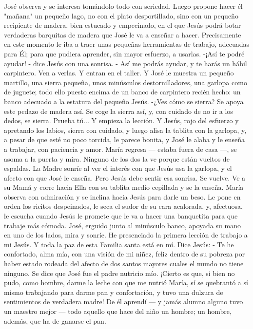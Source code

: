 \documentclass[12pt]{book} %
\begin{document}
José observa y se interesa tomándolo todo con seriedad. Luego propone hacer él "mañana" un pequeño lago, no con el plato desportillado, sino con un pequeño recipiente de madera, bien estucado y empecinado, en el que Jesús podrá botar verdaderas barquitas de madera que José le va a enseñar a hacer. Precisamente en este momento le iba a traer unas pequeñas herramientas de trabajo, adecuadas para Él; para que pudiera aprender, sin mayor esfuerzo, a usarlas. 
-¡Así te podré ayudar! - dice Jesús con una sonrisa. 
- Así me podrás ayudar, y te harás un hábil carpintero. Ven a verlas. 
Y entran en el taller. Y José le muestra un pequeño martillo, una sierra pequeña, unos minúsculos destornilladores, una 
garlopa como de juguete; todo ello puesto encima de un banco de carpintero recién hecho: un banco adecuado a la estatura del pequeño Jesús. 
-¿Ves cómo se sierra? Se apoya este pedazo de madera así. Se coge la sierra así, y, con cuidado de no ir a los dedos, se 
sierra. Prueba tú... 
Y empieza la lección. Y Jesús, rojo del esfuerzo y apretando los labios, sierra con cuidado, y luego alisa la tablita con la 
garlopa, y, a pesar de que esté no poco torcida, le parece bonita, y José le alaba y le enseña a trabajar, con paciencia y amor.           
María regresa — estaba fuera de casa —, se asoma a la puerta y mira. Ninguno de los dos la ve porque están vueltos de 
espaldas. La Madre sonríe al ver el interés con que Jesús usa la garlopa, y el afecto con que José le enseña. 
Pero Jesús debe sentir esa sonrisa. Se vuelve. Ve a su Mamá y corre hacia Ella con su tablita medio cepillada y se la 
enseña. María observa con admiración y se inclina hacia Jesús para darle un beso. Le pone en orden los ricitos despeinados, le seca el sudor de su cara acalorada, y, afectuosa, le escucha cuando Jesús le promete que le va a hacer una banquetita para que trabaje más cómoda.      
José, erguido junto al minúsculo banco, apoyada su mano en uno de los lados, mira y sonríe.                  
He presenciado la primera lección de trabajo a mi Jesús. Y toda la paz de esta Familia santa está en mí. 
Dice Jesús: 
- Te he confortado, alma mía, con una visión de mi niñez, feliz dentro de su pobreza por haber estado rodeada del 
afecto de dos santos mayores cuales el mundo no tiene ninguno. 
Se dice que José fue el padre nutricio mío. ¡Cierto es que, si bien no pudo, como hombre, darme la leche con que me 
nutrió María, sí se quebrantó a sí mismo trabajando para darme pan y confortación, y tuvo una dulzura de sentimientos de verdadera madre! De él aprendí — y jamás alumno alguno tuvo un maestro mejor — todo aquello que hace del niño un hombre; un hombre, además, que ha de ganarse el pan. 
\end{document}
